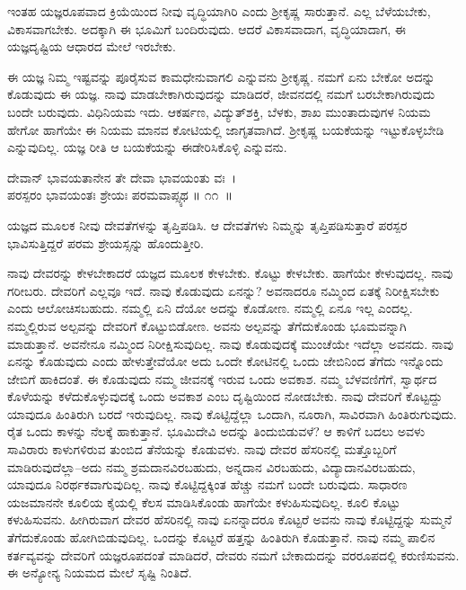 ಇಂತಹ ಯಜ್ಞರೂಪವಾದ ಕ್ರಿಯೆಯಿಂದ ನೀವು ವೃದ್ಧಿಯಾಗಿರಿ ಎಂದು ಶ‍್ರೀಕೃಷ್ಣ ಸಾರುತ್ತಾನೆ. ಎಲ್ಲ ಬೆಳೆಯಬೇಕು, ವಿಕಾಸವಾಗಬೇಕು. ಅದಕ್ಕಾಗಿ ಈ ಭೂಮಿಗೆ ಬಂದಿರುವುದು. ಆದರೆ ವಿಕಾಸವಾದಾಗ, ವೃದ್ಧಿಯಾದಾಗ, ಈ ಯಜ್ಞದೃಷ್ಟಿಯ ಆಧಾರದ ಮೇಲೆ ಇರಬೇಕು.

ಈ ಯಜ್ಞ ನಿಮ್ಮ ಇಷ್ಟವನ್ನು ಪೂರೈಸುವ ಕಾಮಧೇನುವಾಗಲಿ ಎನ್ನುವನು ಶ‍್ರೀಕೃಷ್ಣ. ನಮಗೆ ಏನು ಬೇಕೋ ಅದನ್ನು ಕೊಡುವುದು ಈ ಯಜ್ಞ. ನಾವು ಮಾಡಬೇಕಾಗಿರುವುದನ್ನು ಮಾಡಿದರೆ, ಜೀವನದಲ್ಲಿ ನಮಗೆ ಬರಬೇಕಾಗಿರುವುದು ಬಂದೇ ಬರುವುದು. ವಿಧಿನಿಯಮ ಇದು. ಆಕರ್ಷಣ, ವಿದ್ಯುತ್​ಶಕ್ತಿ, ಬೆಳಕು, ಶಾಖ ಮುಂತಾದುವುಗಳ ನಿಯಮ ಹೇಗೋ ಹಾಗೆಯೇ ಈ ನಿಯಮ ಮಾನವ ಕೋಟಿಯಲ್ಲಿ ಜಾಗೃತವಾಗಿದೆ. ಶ‍್ರೀಕೃಷ್ಣ ಬಯಕೆಯನ್ನು ಇಟ್ಟುಕೊಳ್ಳಬೇಡಿ ಎನ್ನುವುದಿಲ್ಲ. ಯಜ್ಞ ರೀತಿ ಆ ಬಯಕೆಯನ್ನು ಈಡೇರಿಸಿಕೊಳ್ಳಿ ಎನ್ನುವನು.

\begin{shloka}
ದೇವಾನ್ ಭಾವಯತಾನೇನ ತೇ ದೇವಾ ಭಾವಯಂತು ವಃ~।\\ಪರಸ್ಪರಂ ಭಾವಯಂತಃ ಶ್ರೇಯಃ ಪರಮವಾಪ್ಸ್ಯಥ \hfill॥ ೧೧~॥
\end{shloka}

\begin{artha}
ಯಜ್ಞದ ಮೂಲಕ ನೀವು ದೇವತೆಗಳನ್ನು ತೃಪ್ತಿಪಡಿಸಿ. ಆ ದೇವತೆಗಳು ನಿಮ್ಮನ್ನು ತೃಪ್ತಿಪಡಿಸುತ್ತಾರೆ ಪರಸ್ಪರ ಭಾವಿಸುತ್ತಿದ್ದರೆ ಪರಮ ಶ್ರೇಯಸ್ಸನ್ನು ಹೊಂದುತ್ತೀರಿ.
\end{artha}

\newpage

ನಾವು ದೇವರನ್ನು ಕೇಳಬೇಕಾದರೆ ಯಜ್ಞದ ಮೂಲಕ ಕೇಳಬೇಕು. ಕೊಟ್ಟು ಕೇಳಬೇಕು. ಹಾಗೆಯೇ ಕೇಳುವುದಲ್ಲ. ನಾವು ಗರೀಬರು. ದೇವರಿಗೆ ಎಲ್ಲವೂ ಇದೆ. ನಾವು ಕೊಡುವುದು ಏನನ್ನು? ಅವನಾದರೂ ನಮ್ಮಿಂದ ಏತಕ್ಕೆ ನಿರೀಕ್ಷಿಸಬೇಕು ಎಂದು ಆಲೋಚಿಸಬಹುದು. ನಮ್ಮಲ್ಲಿ ಏನಿ ದೆಯೋ ಅದನ್ನು ಕೊಡೋಣ. ನಮ್ಮಲ್ಲಿ ಏನೂ ಇಲ್ಲ ಎಂದಲ್ಲ. ನಮ್ಮಲ್ಲಿರುವ ಅಲ್ಪವನ್ನು ದೇವರಿಗೆ ಕೊಟ್ಟುಬಿಡೋಣ. ಅವನು ಅಲ್ಪವನ್ನು ತೆಗೆದುಕೊಂಡು ಭೂಮವನ್ನಾಗಿ ಮಾಡುತ್ತಾನೆ. ಅವನೇನೂ ನಮ್ಮಿಂದ ನಿರೀಕ್ಷಿಸುವುದಿಲ್ಲ. ನಾವು ಕೊಡುವುದಕ್ಕೆ ಮುಂಚೆಯೇ ಇದೆಲ್ಲಾ ಅವನದು. ನಾವು ಏನನ್ನು ಕೊಡುವುದು ಎಂದು ಹೇಳುತ್ತೇವೆಯೋ ಅದು ಒಂದೇ ಕೋಟಿನಲ್ಲಿ ಒಂದು ಜೇಬಿನಿಂದ ತೆಗೆದು ಇನ್ನೊಂದು ಜೇಬಿಗೆ ಹಾಕಿದಂತೆ. ಈ ಕೊಡುವುದು ನಮ್ಮ ಜೀವನಕ್ಕೆ ಇರುವ ಒಂದು ಅವಕಾಶ. ನಮ್ಮ ಬೆಳವಣಿಗೆಗೆ, ಸ್ವಾರ್ಥದ ಕೊಳೆಯನ್ನು ಕಳೆದುಕೊಳ್ಳುವುದಕ್ಕೆ ಒಂದು ಅವಕಾಶ ಎಂಬ ದೃಷ್ಟಿಯಿಂದ ನೋಡಬೇಕು. ನಾವು ದೇವರಿಗೆ ಕೊಟ್ಟದ್ದು ಯಾವುದೂ ಹಿಂತಿರುಗಿ ಬರದೆ ಇರುವುದಿಲ್ಲ. ನಾವು ಕೊಟ್ಟಿದ್ದೆಲ್ಲಾ ಒಂದಾಗಿ, ನೂರಾಗಿ, ಸಾವಿರವಾಗಿ ಹಿಂತಿರುಗುವುದು. ರೈತ ಒಂದು ಕಾಳನ್ನು ನೆಲಕ್ಕೆ ಹಾಕುತ್ತಾನೆ. ಭೂಮಿದೇವಿ ಅದನ್ನು ತಿಂದುಬಿಡುವಳೆ? ಆ ಕಾಳಿಗೆ ಬದಲು ಅವಳು ಸಾವಿರಾರು ಕಾಳುಗಳಿರುವ ತುಂಬಿದ ತೆನೆಯನ್ನು ಕೊಡುವಳು. ನಾವು ದೇವರ ಹೆಸರಿನಲ್ಲಿ ಮತ್ತೊಬ್ಬರಿಗೆ ಮಾಡಿರುವುದೆಲ್ಲಾ–ಅದು ನಮ್ಮ ಶ್ರಮದಾನವಿರಬಹುದು, ಅನ್ನದಾನ ವಿರಬಹುದು, ವಿದ್ಯಾದಾನವಿರಬಹುದು, ಯಾವುದೂ ನಿರರ್ಥಕವಾಗುವುದಿಲ್ಲ. ನಾವು ಕೊಟ್ಟಿದ್ದಕ್ಕಿಂತ ಹೆಚ್ಚು ನಮಗೆ ಬಂದೇ ಬರುವುದು. ಸಾಧಾರಣ ಯಜಮಾನನೇ ಕೂಲಿಯ ಕೈಯಲ್ಲಿ ಕೆಲಸ ಮಾಡಿಸಿಕೊಂಡು ಹಾಗೆಯೇ ಕಳುಹಿಸುವುದಿಲ್ಲ. ಕೂಲಿ ಕೊಟ್ಟು ಕಳುಹಿಸುವನು. ಹೀಗಿರುವಾಗ ದೇವರ ಹೆಸರಿನಲ್ಲಿ ನಾವು ಏನನ್ನಾದರೂ ಕೊಟ್ಟರೆ ಅವನು ನಾವು ಕೊಟ್ಟಿದ್ದನ್ನು ಸುಮ್ಮನೆ ತೆಗೆದುಕೊಂಡು ಹೋಗಿಬಿಡುವುದಿಲ್ಲ. ಒಂದನ್ನು ಕೊಟ್ಟರೆ ಹತ್ತನ್ನು ಹಿಂತಿರುಗಿ ಕೊಡುತ್ತಾನೆ. ನಾವು ನಮ್ಮ ಪಾಲಿನ ಕರ್ತವ್ಯವನ್ನು ದೇವರಿಗೆ ಯಜ್ಞರೂಪದಂತೆ ಮಾಡಿದರೆ, ದೇವರು ನಮಗೆ ಬೇಕಾದುದನ್ನು ವರರೂಪದಲ್ಲಿ ಕರುಣಿಸುವನು. ಈ ಅನ್ಯೋನ್ಯ ನಿಯಮದ ಮೇಲೆ ಸೃಷ್ಟಿ ನಿಂತಿದೆ.

